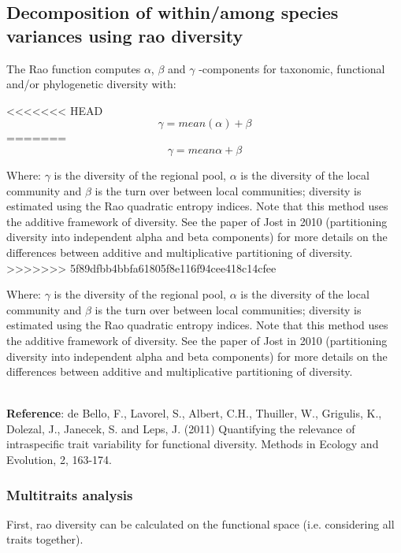 \documentclass[12pt]{article}\usepackage[]{graphicx}\usepackage[]{color}
\begin{document}
\subsection{Decomposition of within/among species variances using rao diversity}

The Rao function computes $\alpha$, $\beta$ and $\gamma$ -components for taxonomic, functional and/or phylogenetic diversity with:

<<<<<<< HEAD
$$ \gamma = mean (\alpha) + \beta $$
=======
\[ \gamma = mean \alpha + \beta \]



Where: $\gamma$ is the diversity of the regional pool, $\alpha$ is the diversity of the local community and $\beta$ is the turn over between local communities; diversity is estimated using the Rao quadratic entropy indices. Note that this method uses the additive framework of diversity. See the paper of Jost in 2010 (partitioning diversity into independent alpha and beta components) for more details on the differences between additive and multiplicative partitioning of diversity.
>>>>>>> 5f89dfbb4bbfa61805f8e116f94cee418c14cfee


Where: $\gamma$ is the diversity of the regional pool, $\alpha$ is the diversity of the local community and $\beta$ is the turn over between local communities; diversity is estimated using the Rao quadratic entropy indices. Note that this method uses the additive framework of diversity. See the paper of Jost in 2010 (partitioning diversity into independent alpha and beta components) for more details on the differences between additive and multiplicative partitioning of diversity.

\\

\textbf{Reference}: de Bello, F., Lavorel, S., Albert, C.H., Thuiller, W., Grigulis, K., Dolezal, J., Janecek, S. and Leps, J. (2011) Quantifying the relevance of intraspecific trait variability for functional diversity. Methods in Ecology and Evolution, 2, 163-174.


\subsubsection{Multitraits analysis}
First, rao diversity can be calculated on the functional  space (i.e. considering all traits together).
\end{document}
